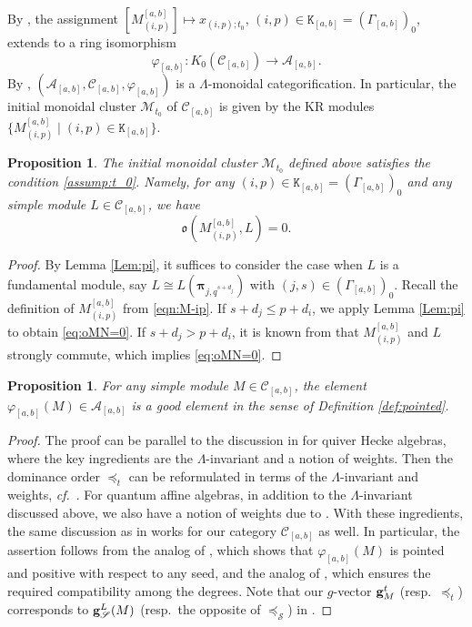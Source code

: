 \documentclass[12pt]{amsart}
\newtheorem{proposition}[theorem]{Proposition}
\theoremstyle{definition}
\theoremstyle{remark}
\numberwithin{equation}{section}
\newcommand{\confer}{\textit{cf.}\ }
\begin{document}
By \cite[Theorem 5.1]{HL16}, the assignment $[M_{(i,p)}^{[a,b]}]\mapsto x_{(i,p);t_0}$, $(i,p)\in \mathtt{K}_{[a,b]}=(\Gamma_{[a,b]})_0$, extends to a ring isomorphism \[\varphi_{[a,b]} \colon {K}_0(\mathcal{C}_{[a,b]}) \to \mathcal{A}_{[a,b]}.\] 
By \cite{kkop-2024}, $(\mathcal A_{[a,b]}, \mathcal C_{[a,b]}, \varphi_{[a,b]})$ is a $\mathsf{\Lambda}$-monoidal categorification.  In particular, the initial monoidal cluster $\mathcal M_{t_0}$ of $\mathcal C_{[a,b]}$ is given by the KR modules $\{ M^{[a,b]}_{(i,p)} \mid (i,p) \in \mathtt{K}_{[a,b]}\}$. 


\begin{proposition}\label{pro:standard-cor}
The initial monoidal cluster $\mathcal{M}_{t_0}$ defined above satisfies the condition \eqref{assump:t_0}.
Namely, for any $(i,p) \in \mathtt{K}_{[a,b]}=(\Gamma_{[a,b]})_0$ and any simple module $L \in \mathcal{C}_{[a,b]}$, we have 
\begin{equation} \label{eq:oMN=0}
\mathfrak{o}(M_{(i,p)}^{[a,b]}, L) = 0.
\end{equation}
\end{proposition}
\begin{proof}
By Lemma \ref{Lem:pi}, it suffices to consider the case when $L$ is a fundamental module, say $L \cong L( \boldsymbol{\pi}_{j,q^{s+d_j}})$ with $(j,s) \in (\Gamma_{[a,b]})_0$. Recall the definition of $M^{[a,b]}_{(i,p)}$ from \eqref{eqn:M-ip}. 
If $s+d_j \le p+d_i$, we apply Lemma \ref{Lem:pi} to obtain \eqref{eq:oMN=0}.
If $s+d_j > p+d_i$, it is known from \cite[Proposition 4.19]{kkop-2024} that $M^{[a,b]}_{(i,p)}$ and $L$ strongly commute, which implies \eqref{eq:oMN=0}.
\end{proof}

\begin{proposition}\label{prop:good}
For any simple module $M \in \mathcal{C}_{[a,b]}$, the element $\varphi_{[a,b]}(M)\in\mathcal A_{[a,b]}$ is a good element in the sense of Definition \ref{def:pointed}.
\end{proposition}
\begin{proof}
The proof can be parallel to the discussion in \cite[\S\S3.2--3.5]{kk_2019} for quiver Hecke algebras, where the
key ingredients are the $\Lambda$-invariant and a notion of weights. Then the dominance order $\preceq_t$ can be reformulated in terms of the $\Lambda$-invariant and weights, \confer \cite[Proposition 3.3]{kk_2019}.
For quantum affine algebras, in addition to the $\Lambda$-invariant discussed above, we also have a notion of weights due to \cite{kkop-2022}. With these ingredients, the same discussion as in \cite[\S\S3.2--3.5]{kk_2019} works for our category $\mathcal{C}_{[a,b]}$ as well.
In particular, the assertion follows from the analog of \cite[Lemma 3.6(ii)]{kk_2019}, which shows that $\varphi_{[a,b]}(M)$ is pointed and positive with respect to any seed, and the analog of \cite[Theorem 3.16]{kk_2019}, which ensures the required compatibility among the degrees.
Note that our $g$-vector ${\bf g}^t_M$ (resp.\ $\preceq_t$) corresponds to ${\bf g}_{\mathscr{S}}^{L}(M)$ (resp.\  the opposite of $\preceq_{\mathscr{S}}$) in \cite{kk_2019}.
\end{proof}
\end{document}
